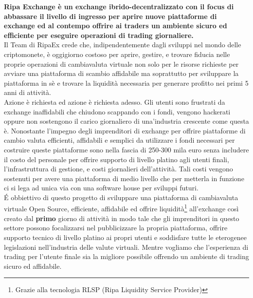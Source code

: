 \documentclass[11pt,fleqn]{book} %
\begin{document}
\textbf{Ripa Exchange è un exchange ibrido-decentralizzato con il focus di abbassare il livello di ingresso per aprire 
nuove piattaforme di exchange ed al contempo offrire ai traders un ambiente sicuro ed efficiente per eseguire operazioni di 
trading giornaliere.}\\

Il Team di RipaEx crede che, indipendentemente dagli sviluppi nel mondo delle criptomonete, è oggigiorno costoso per aprire,
gestire, e trovare fiducia nelle proprie operazioni di cambiavaluta virtuale non solo per le risorse richieste per avviare
una piattaforma di scambio affidabile ma soprattutto per sviluppare la piattaforma in sè e trovare la liquidità 
necessaria per generare profitto nei primi 5 anni di attività.\\

Azione è richiesta ed azione è richiesta adesso. Gli utenti sono frustrati da exchange inaffidabili che chiudono scappando con i 
fondi, vengono hackerati oppure non sostengono il carico giornaliero di una'industria crescente come questa è.
Nonostante l'impegno degli imprenditori di exchange per offrire piattaforme di cambio valuta efficienti, affidabili e 
semplici da utilizzare i fondi necessari per costruire queste piattaforme sono nella fascia di 250-300 mila euro senza includere
il costo del personale per offrire supporto di livello platino agli utenti finali, l'infrastruttura di gestione, e costi giornalieri
dell'attività. Tali costi vengono sostenuti per avere una piattaforma di medio livello che per metterla in funzione ci si lega 
ad unica via con una software house per sviluppi futuri.\\

É obbiettivo di questo progetto di sviluppare una piattaforma di cambiavaluta virtuale Open Source, efficiente, affidabile ed 
offrire liquidità\footnote{Grazie alla tecnologia RLSP (Ripa Liquidity Service Provider)} all'exchange così creato dal \textbf{primo}
giorno di attività in modo tale che gli imprenditori in questo settore possono focalizzarsi nel pubblicizzare la propria piattaforma,
offrire supporto tecnico di livello platino ai propri utenti e soddisfare tutte le eterogenee legislazioni nell'industria delle valute virtuali.
Mentre vogliamo che l'esperienza di trading per l'utente finale sia la migliore possibile offrendo un ambiente di trading sicuro ed affidabile.\\
\usechapterimagetrue

\renewcommand*\contentsname{Indice dei Contenuti}
\tableofcontents %
\cleardoublepage %
\pagestyle{fancy} %
\end{document}
